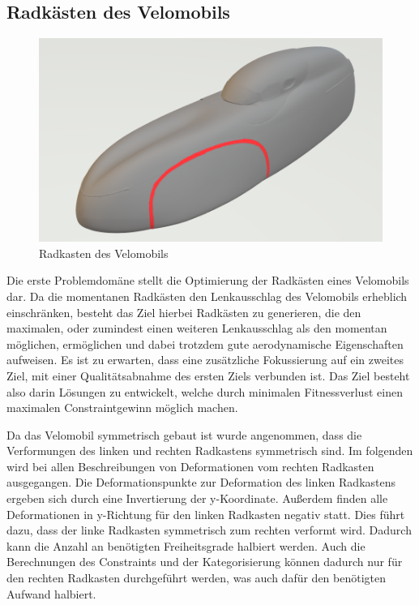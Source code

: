 \subsection{Radkästen des Velomobils}
\label{sub:method_wheelcase}
\begin{figure}[h]
	\centering
	\includegraphics[width=.8\linewidth]{bilder/velo_wheelcase}
	\caption{Radkasten des Velomobils}
	\label{fig:wheelcase}
\end{figure}

Die erste Problemdomäne stellt die Optimierung der Radkästen eines Velomobils dar.
Da die momentanen Radkästen den Lenkausschlag des Velomobils erheblich einschränken, besteht das Ziel hierbei Radkästen zu generieren, die den maximalen, oder zumindest einen weiteren Lenkausschlag als den momentan möglichen, ermöglichen und dabei trotzdem gute aerodynamische Eigenschaften aufweisen.
Es ist zu erwarten, dass eine zusätzliche Fokussierung auf ein zweites Ziel, mit einer Qualitätsabnahme des ersten Ziels verbunden ist.
Das Ziel besteht also darin Lösungen zu entwickelt, welche durch minimalen Fitnessverlust einen maximalen Constraintgewinn möglich machen.

Da das Velomobil symmetrisch gebaut ist wurde angenommen, dass die Verformungen des linken und rechten Radkastens symmetrisch sind.
Im folgenden wird bei allen Beschreibungen von Deformationen vom rechten Radkasten ausgegangen.
Die Deformationspunkte zur Deformation des linken Radkastens ergeben sich durch eine Invertierung der y-Koordinate.
Außerdem finden alle Deformationen in y-Richtung für den linken Radkasten negativ statt.
Dies führt dazu, dass der linke Radkasten symmetrisch zum rechten verformt wird.
Dadurch kann die Anzahl an benötigten Freiheitsgrade halbiert werden. 
Auch die Berechnungen des Constraints und der Kategorisierung können dadurch nur für den rechten Radkasten durchgeführt werden, was auch dafür den benötigten Aufwand halbiert.

